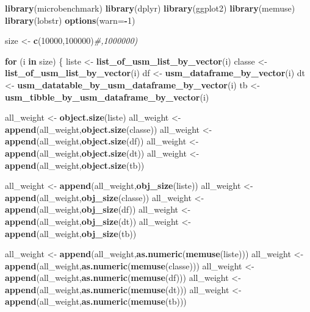 \documentclass[
]{article}
\newenvironment{Shaded}{\begin{snugshade}}{\end{snugshade}}
\newcommand{\CommentTok}[1]{\textcolor[rgb]{0.56,0.35,0.01}{\textit{#1}}}
\newcommand{\ControlFlowTok}[1]{\textcolor[rgb]{0.13,0.29,0.53}{\textbf{#1}}}
\newcommand{\DataTypeTok}[1]{\textcolor[rgb]{0.13,0.29,0.53}{#1}}
\newcommand{\DecValTok}[1]{\textcolor[rgb]{0.00,0.00,0.81}{#1}}
\newcommand{\KeywordTok}[1]{\textcolor[rgb]{0.13,0.29,0.53}{\textbf{#1}}}
\newcommand{\NormalTok}[1]{#1}
\newcommand{\OperatorTok}[1]{\textcolor[rgb]{0.81,0.36,0.00}{\textbf{#1}}}
\newcommand{\StringTok}[1]{\textcolor[rgb]{0.31,0.60,0.02}{#1}}
\begin{document}
\begin{Shaded}
\begin{Highlighting}[]
\KeywordTok{library}\NormalTok{(microbenchmark)}
\KeywordTok{library}\NormalTok{(dplyr)}
\KeywordTok{library}\NormalTok{(ggplot2)}
\KeywordTok{library}\NormalTok{(memuse)}
\KeywordTok{library}\NormalTok{(lobstr)}
\KeywordTok{options}\NormalTok{(}\DataTypeTok{warn=}\OperatorTok{-}\DecValTok{1}\NormalTok{)}

\NormalTok{size <-}\StringTok{ }\KeywordTok{c}\NormalTok{(}\DecValTok{10000}\NormalTok{,}\DecValTok{100000}\NormalTok{)}\CommentTok{#,1000000)}

\ControlFlowTok{for}\NormalTok{ (i }\ControlFlowTok{in}\NormalTok{ size) \{}
\NormalTok{  liste <-}\StringTok{ }\KeywordTok{list_of_usm_list_by_vector}\NormalTok{(i)}
\NormalTok{  classe <-}\StringTok{ }\KeywordTok{list_of_usm_list_by_vector}\NormalTok{(i)}
\NormalTok{  df <-}\StringTok{ }\KeywordTok{usm_dataframe_by_vector}\NormalTok{(i)}
\NormalTok{  dt <-}\StringTok{ }\KeywordTok{usm_datatable_by_usm_dataframe_by_vector}\NormalTok{(i)}
\NormalTok{  tb <-}\StringTok{ }\KeywordTok{usm_tibble_by_usm_dataframe_by_vector}\NormalTok{(i)}
  
\NormalTok{  all_weight <-}\StringTok{ }\KeywordTok{object.size}\NormalTok{(liste)}
\NormalTok{  all_weight <-}\StringTok{ }\KeywordTok{append}\NormalTok{(all_weight,}\KeywordTok{object.size}\NormalTok{(classe))}
\NormalTok{  all_weight <-}\StringTok{ }\KeywordTok{append}\NormalTok{(all_weight,}\KeywordTok{object.size}\NormalTok{(df))}
\NormalTok{  all_weight <-}\StringTok{ }\KeywordTok{append}\NormalTok{(all_weight,}\KeywordTok{object.size}\NormalTok{(dt))}
\NormalTok{  all_weight <-}\StringTok{ }\KeywordTok{append}\NormalTok{(all_weight,}\KeywordTok{object.size}\NormalTok{(tb))}
  
\NormalTok{  all_weight <-}\StringTok{ }\KeywordTok{append}\NormalTok{(all_weight,}\KeywordTok{obj_size}\NormalTok{(liste))}
\NormalTok{  all_weight <-}\StringTok{ }\KeywordTok{append}\NormalTok{(all_weight,}\KeywordTok{obj_size}\NormalTok{(classe))}
\NormalTok{  all_weight <-}\StringTok{ }\KeywordTok{append}\NormalTok{(all_weight,}\KeywordTok{obj_size}\NormalTok{(df))}
\NormalTok{  all_weight <-}\StringTok{ }\KeywordTok{append}\NormalTok{(all_weight,}\KeywordTok{obj_size}\NormalTok{(dt))}
\NormalTok{  all_weight <-}\StringTok{ }\KeywordTok{append}\NormalTok{(all_weight,}\KeywordTok{obj_size}\NormalTok{(tb))}
  
\NormalTok{  all_weight <-}\StringTok{ }\KeywordTok{append}\NormalTok{(all_weight,}\KeywordTok{as.numeric}\NormalTok{(}\KeywordTok{memuse}\NormalTok{(liste)))}
\NormalTok{  all_weight <-}\StringTok{ }\KeywordTok{append}\NormalTok{(all_weight,}\KeywordTok{as.numeric}\NormalTok{(}\KeywordTok{memuse}\NormalTok{(classe)))}
\NormalTok{  all_weight <-}\StringTok{ }\KeywordTok{append}\NormalTok{(all_weight,}\KeywordTok{as.numeric}\NormalTok{(}\KeywordTok{memuse}\NormalTok{(df)))}
\NormalTok{  all_weight <-}\StringTok{ }\KeywordTok{append}\NormalTok{(all_weight,}\KeywordTok{as.numeric}\NormalTok{(}\KeywordTok{memuse}\NormalTok{(dt)))}
\NormalTok{  all_weight <-}\StringTok{ }\KeywordTok{append}\NormalTok{(all_weight,}\KeywordTok{as.numeric}\NormalTok{(}\KeywordTok{memuse}\NormalTok{(tb)))}
  

\end{Highlighting}
\end{Shaded}
\end{document}
